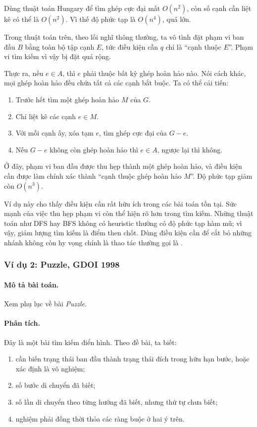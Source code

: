 \documentclass[11pt]{article}
\begin{document}
Dùng thuật toán Hungary để tìm ghép cực đại mất $O(n^2)$, còn số cạnh cần
liệt kê có thể là $O(n^2)$. Vì thế độ phức tạp là $O(n^4)$, quá lớn.

Trong thuật toán trên, theo lối nghĩ thông thường, ta vô tình đặt phạm vi ban
đầu $B$ bằng toàn bộ tập cạnh $E$, tức điều kiện cần $q$ chỉ là ``cạnh thuộc
$E$''. Phạm vi tìm kiếm vì vậy bị đặt quá rộng.

Thực ra, nếu $e\in A$, thì $e$ phải thuộc bất kỳ ghép hoàn hảo nào. Nói cách
khác, mọi ghép hoàn hảo đều chứa tất cả các cạnh bắt buộc. Ta có thể cải tiến:
\begin{enumerate}
  \item Trước hết tìm một ghép hoàn hảo $M$ của $G$.
  \item Chỉ liệt kê các cạnh $e\in M$.
  \item Với mỗi cạnh ấy, xóa tạm $e$, tìm ghép cực đại của $G-e$.
  \item Nếu $G-e$ không còn ghép hoàn hảo thì $e\in A$, ngược lại thì không.
\end{enumerate}

Ở đây, phạm vi ban đầu được thu hẹp thành một ghép hoàn hảo, và điều kiện cần
được làm chính xác thành ``cạnh thuộc ghép hoàn hảo $M$''. Độ phức tạp giảm
còn $O(n^3)$.

Ví dụ này cho thấy điều kiện cần rất hữu ích trong các bài toán tồn tại.
Sức mạnh của việc thu hẹp phạm vi còn thể hiện rõ hơn trong tìm kiếm.
Những thuật toán như DFS hay BFS không có heuristic thường có độ phức tạp
hàm mũ; vì vậy, giảm lượng tìm kiếm là điểm then chốt. Dùng điều kiện cần để
cắt bỏ những nhánh không còn hy vọng chính là thao tác thường gọi là
.

\subsubsection*{Ví dụ 2: Puzzle, GDOI 1998}

\paragraph{Mô tả bài toán.}
Xem phụ lục về bài \emph{Puzzle}.

\paragraph{Phân tích.}
Đây là một bài tìm kiếm điển hình. Theo đề bài, ta biết:
\begin{enumerate}
  \item cần biến trạng thái ban đầu thành trạng thái đích trong hữu hạn bước,
  hoặc xác định là vô nghiệm;
  \item số bước di chuyển đã biết;
  \item số lần di chuyển theo từng hướng đã biết, nhưng thứ tự chưa biết;
  \item nghiệm phải đồng thời thỏa các ràng buộc ở hai ý trên.
\end{enumerate}
\end{document}
